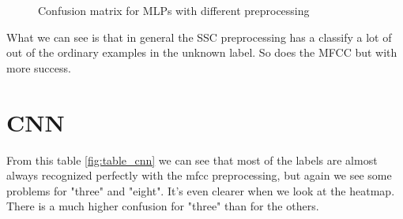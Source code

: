 \begin{figure}[h!]

    \centering
    \qquad
    \caption{Confusion matrix for MLPs with different preprocessing}
    \label{fig:confusion_mlp}

\end{figure}

What we can see is that in general the SSC preprocessing has a classify a lot of out of the ordinary examples in the unknown label. So does the MFCC but with more success.

\newpage

\section{CNN}




From this table \ref{fig:table_cnn} we can see that most of the labels are almost always recognized perfectly with the mfcc preprocessing, but again we see some problems for "three" and "eight". It's even clearer when we look at the heatmap. There is a much higher confusion for "three" than for the others.



